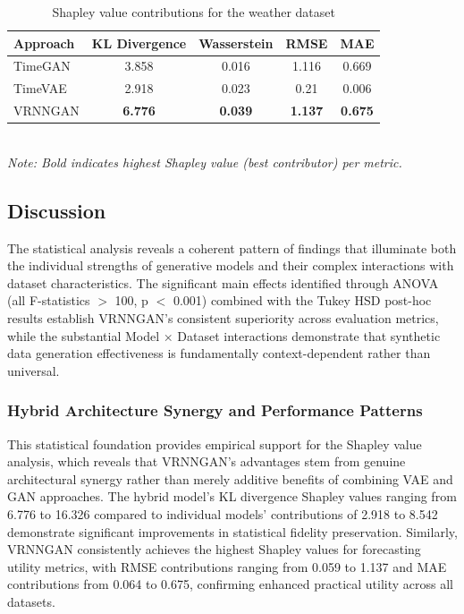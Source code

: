 \documentclass[11pt]{article}
\begin{document}
\begin{table}[H]
\centering
\caption{Shapley value contributions for the weather dataset}
\label{tab:shapley_weather}
\begin{tabular}{lcccc}
\toprule
\textbf{Approach} & \textbf{KL Divergence} & \textbf{Wasserstein} & \textbf{RMSE} & \textbf{MAE} \\
\midrule
TimeGAN & 3.858 & 0.016 & 1.116 & 0.669 \\
TimeVAE & 2.918 & 0.023 & 0.21 & 0.006 \\
VRNNGAN & \textbf{6.776} & \textbf{0.039} & \textbf{1.137} & \textbf{0.675} \\
\bottomrule
\end{tabular}
\\[0.5em]
\footnotesize
\textit{Note: Bold indicates highest Shapley value (best contributor) per metric.}
\end{table}

\subsection{Discussion}

The statistical analysis reveals a coherent pattern of findings that illuminate both the individual strengths of generative models and their complex interactions with dataset characteristics. The significant main effects identified through ANOVA (all F-statistics $>$ 100, p $<$ 0.001) combined with the Tukey HSD post-hoc results establish VRNNGAN's consistent superiority across evaluation metrics, while the substantial Model × Dataset interactions demonstrate that synthetic data generation effectiveness is fundamentally context-dependent rather than universal.

\subsubsection*{Hybrid Architecture Synergy and Performance Patterns}

This statistical foundation provides empirical support for the Shapley value analysis, which reveals that VRNNGAN's advantages stem from genuine architectural synergy rather than merely additive benefits of combining VAE and GAN approaches. The hybrid model's KL divergence Shapley values ranging from 6.776 to 16.326 compared to individual models' contributions of 2.918 to 8.542 demonstrate significant improvements in statistical fidelity preservation. Similarly, VRNNGAN consistently achieves the highest Shapley values for forecasting utility metrics, with RMSE contributions ranging from 0.059 to 1.137 and MAE contributions from 0.064 to 0.675, confirming enhanced practical utility across all datasets.
\end{document}
